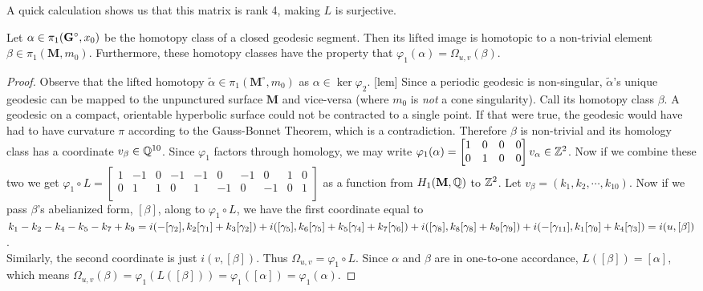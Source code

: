 \documentclass[a4paper, 11pt]{article}
\def\bM{\mathbf{M}}
\def\bMs{\mathbf{M}^\circ}
\begin{document}
A quick calculation shows us that this matrix is rank 4, making $L$ is surjective. 

\begin{thm}
Let $\alpha\in\pi_1(\mathbf{G}^\circ,x_0)$ be the homotopy class of a closed geodesic segment. Then its lifted image is homotopic to a non-trivial element $\beta\in\pi_1(\bM,m_0)$. Furthermore, these homotopy classes have the property that $\varphi_1(\alpha)=\Omega_{u,v}(\beta)$.
\begin{proof}
Observe that the lifted homotopy  $\tilde{\alpha}\in\pi_1(\bMs,m_0)$ as $\alpha\in\ker\varphi_2$. [lem] Since a periodic geodesic is non-singular, $\tilde{\alpha}$'s unique geodesic can be mapped to the unpunctured surface $\bM$ and vice-versa (where $m_0$ is \emph{not} a cone singularity). Call its homotopy class $\beta$. A geodesic on a compact, orientable hyperbolic surface could not be contracted to a single point. If that were true, the geodesic would have had to have curvature $\pi$ according to the Gauss-Bonnet Theorem, which is a contradiction. Therefore $\beta$ is non-trivial and its homology class has a coordinate $v_{\beta}\in \mathbb{Q}^{10}$. Since $\varphi_1$ factors through homology, we may write $\varphi_1(\alpha)=\left[\begin{matrix} 1 & 0 & 0 & 0\\0 & 1 & 0 & 0\end{matrix}\right]v_\alpha\in\mathbb{Z}^2$. Now if we combine these two we get $\varphi_1\circ L=\left[\begin{matrix}
1 & -1 & 0 & -1 & -1 & 0 & -1 & 0 & 1 & 0\\
0 & 1 & 1 & 0 & 1 & -1 & 0 & -1 & 0 & 1\\
\end{matrix}\right]$ as a function from $H_1(\bM,\QQ)$ to $\mathbb{Z}^2$. Let $v_\beta=(k_1,k_2,\cdots,k_{10})$. Now if we pass $\beta$'s abelianized form, $[\beta]$, along to $\varphi_1\circ L$, we have the first coordinate equal to $k_1-k_2-k_4-k_5-k_7+k_9\\
=i(-[\gamma_2],k_2[\gamma_1]+k_3[\gamma_2])+i([\gamma_5], k_6[\gamma_5]+k_5[\gamma_4]+k_7[\gamma_6])\\+i([\gamma_8],k_8[\gamma_8]+k_9[\gamma_9])+i(-[\gamma_{11}],k_1[\gamma_{0}]+k_4[\gamma_3])\\=i(u,[\beta])$.\\
Similarly, the second coordinate is just $i(v,[\beta])$. Thus $\Omega_{u,v}=\varphi_1\circ L$. Since $\alpha$ and $\beta$ are in one-to-one accordance, $L([\beta])=[\alpha]$, which means $\Omega_{u,v}(\beta)=\varphi_1(L([\beta]))=\varphi_1([\alpha])=\varphi_1(\alpha)$.
\end{proof}
\end{thm}
\end{document}
